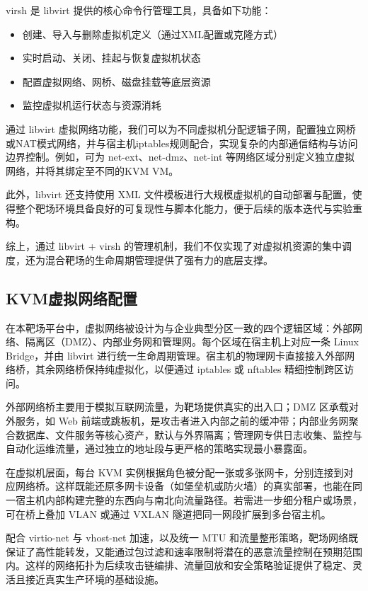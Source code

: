 \documentclass[lang=cn,10pt]{elegantbook}
\begin{document}
virsh 是 libvirt 提供的核心命令行管理工具，具备如下功能：

\begin{itemize}
  \item 创建、导入与删除虚拟机定义（通过XML配置或克隆方式）
  \item 实时启动、关闭、挂起与恢复虚拟机状态
  \item 配置虚拟网络、网桥、磁盘挂载等底层资源
  \item 监控虚拟机运行状态与资源消耗
\end{itemize}

通过 libvirt 虚拟网络功能，我们可以为不同虚拟机分配逻辑子网，配置独立网桥或NAT模式网络，并与宿主机iptables规则配合，实现复杂的内部通信结构与访问边界控制。例如，可为 net-ext、net-dmz、net-int 等网络区域分别定义独立虚拟网络，并将其绑定至不同的KVM VM。

此外，libvirt 还支持使用 XML 文件模板进行大规模虚拟机的自动部署与配置，使得整个靶场环境具备良好的可复现性与脚本化能力，便于后续的版本迭代与实验重构。

综上，通过 libvirt + virsh 的管理机制，我们不仅实现了对虚拟机资源的集中调度，还为混合靶场的生命周期管理提供了强有力的底层支撑。

\subsection{KVM虚拟网络配置}

在本靶场平台中，虚拟网络被设计为与企业典型分区一致的四个逻辑区域：外部网络、隔离区（DMZ）、内部业务网和管理网。每个区域在宿主机上对应一条 Linux Bridge，并由 libvirt 进行统一生命周期管理。宿主机的物理网卡直接接入外部网络桥，其余网络桥保持纯虚拟化，以便通过 iptables 或 nftables 精细控制跨区访问。

外部网络桥主要用于模拟互联网流量，为靶场提供真实的出入口；DMZ 区承载对外服务，如 Web 前端或跳板机，是攻击者进入内部之前的缓冲带；内部业务网聚合数据库、文件服务等核心资产，默认与外界隔离；管理网专供日志收集、监控与自动化运维流量，通过独立的地址段与更严格的策略实现最小暴露面。

在虚拟机层面，每台 KVM 实例根据角色被分配一张或多张网卡，分别连接到对应网络桥。这样既能还原多网卡设备（如堡垒机或防火墙）的真实部署，也能在同一宿主机内部构建完整的东西向与南北向流量路径。若需进一步细分租户或场景，可在桥上叠加 VLAN 或通过 VXLAN 隧道把同一网段扩展到多台宿主机。

配合 virtio-net 与 vhost-net 加速，以及统一 MTU 和流量整形策略，靶场网络既保证了高性能转发，又能通过包过滤和速率限制将潜在的恶意流量控制在预期范围内。这样的网络拓扑为后续攻击链编排、流量回放和安全策略验证提供了稳定、灵活且接近真实生产环境的基础设施。
\end{document}
